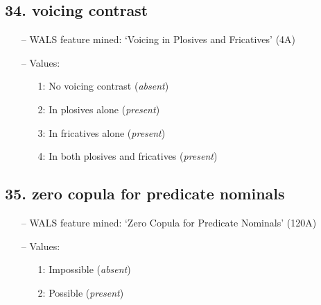 \subsection*{34. voicing contrast}

\begin{itemize}
\item[--] WALS feature mined: `Voicing in Plosives and Fricatives' (4A)
\item[--] Values:

\begin{enumerate}
\item[1:] No voicing contrast (\emph{absent})
\item[2:] In plosives alone (\emph{present})
\item[3:] In fricatives alone (\emph{present})
\item[4:] In both plosives and fricatives (\emph{present})
\end{enumerate}
\end{itemize}

\subsection*{35. zero copula for predicate nominals}

\begin{itemize}
\item[--] WALS feature mined: `Zero Copula for Predicate Nominals' (120A)
\item[--] Values:

\begin{enumerate}
\item[1:] Impossible (\emph{absent})
\item[2:] Possible (\emph{present})
\end{enumerate}
\end{itemize}

